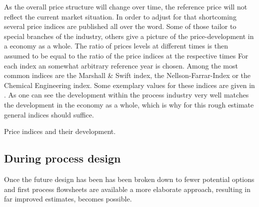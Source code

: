         As the overall price structure will change over time, the reference price will not reflect the current
        market situation. In order to adjust for that shortcoming several price indices are published
        all over the word. Some of those tailor to special branches of the industry, others give a picture
        of the price-development in a economy as a whole. The ratio of prices levels at different times
        is then assumed to be equal to the ratio of the price indices at the respective times
        For each index an somewhat arbitrary reference year is chosen. Among the most common indices are the
        Marshall \& Swift index, the Nellson-Farrar-Index or the Chemical Engineering index. Some exemplary
        values for these indices are given in . As one can see the development within the
        process industry very well matches the development in the economy as a whole, which is why for this rough
        estimate general indices should suffice.

        \begin{table}
        	\center
        	
        	\caption{Price indices and their development.\cite{Coulson.1999}}
        	\label{tab:PriceIndices}
        \end{table}

    \subsection{During process design}
        Once the future design has been has been broken down to fewer potential options and first process
        flowsheets are available a more elaborate approach, resulting in far improved estimates, becomes possible.


